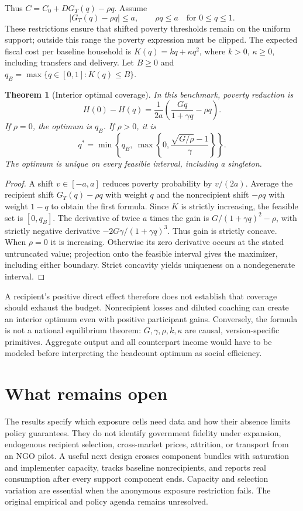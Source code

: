 \documentclass[11pt]{article}
\newtheorem{theorem}{Theorem}
\theoremstyle{remark}
\begin{document}
Thus $C=C_0+D G_T(q)-\rho q$. Assume
\[
 |G_T(q)-\rho q|\leq a,\qquad \rho q\leq a
 \quad\text{for }0\leq q\leq1.
\]
These restrictions ensure that shifted poverty thresholds remain on the uniform support; outside this range the poverty expression must be clipped. The expected fiscal cost per baseline household is $K(q)=kq+\kappa q^2$, where $k>0$, $\kappa\geq0$, including transfers and delivery. Let $B\geq0$ and $q_B=\max\{q\in[0,1]:K(q)\leq B\}$.

\begin{theorem}[Interior optimal coverage]
In this benchmark, poverty reduction is
\[
 H(0)-H(q)=\frac1{2a}\left(\frac{Gq}{1+\gamma q}-\rho q\right).
\]
If $\rho=0$, the optimum is $q_B$. If $\rho>0$, it is
\[
 q^*=\min\left\{q_B,\ \max\left\{0,
                   \frac{\sqrt{G/\rho}-1}{\gamma}\right\}\right\}.
\]
The optimum is unique on every feasible interval, including a singleton.
\end{theorem}
\begin{proof}
A shift $v\in[-a,a]$ reduces poverty probability by $v/(2a)$. Average the recipient shift $G_T(q)-\rho q$ with weight $q$ and the nonrecipient shift $-\rho q$ with weight $1-q$ to obtain the first formula. Since $K$ is strictly increasing, the feasible set is $[0,q_B]$. The derivative of twice $a$ times the gain is $G/(1+\gamma q)^2-\rho$, with strictly negative derivative $-2G\gamma/(1+\gamma q)^3$. Thus gain is strictly concave. When $\rho=0$ it is increasing. Otherwise its zero derivative occurs at the stated untruncated value; projection onto the feasible interval gives the maximizer, including either boundary. Strict concavity yields uniqueness on a nondegenerate interval.
\end{proof}

A recipient's positive direct effect therefore does not establish that coverage should exhaust the budget. Nonrecipient losses and diluted coaching can create an interior optimum even with positive participant gains. Conversely, the formula is not a national equilibrium theorem: $G,\gamma,\rho,k,\kappa$ are causal, version-specific primitives. Aggregate output and all counterpart income would have to be modeled before interpreting the headcount optimum as social efficiency.

\section{What remains open}
The results specify which exposure cells need data and how their absence limits policy guarantees. They do not identify government fidelity under expansion, endogenous recipient selection, cross-market prices, attrition, or transport from an NGO pilot. A useful next design crosses component bundles with saturation and implementer capacity, tracks baseline nonrecipients, and reports real consumption after every support component ends. Capacity and selection variation are essential when the anonymous exposure restriction fails. The original empirical and policy agenda remains unresolved.
\end{document}
